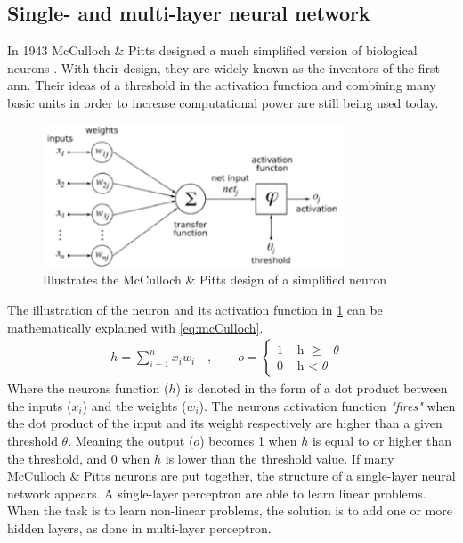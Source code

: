 \documentclass[USenglish]{ifimaster}  %
\begin{document}
\subsection{Single- and multi-layer neural network}
In 1943 McCulloch \& Pitts designed a much simplified version of biological neurons \cite{mcculloch_pitts}. With their design, they are widely known as the inventors of the first \ac{ann}. Their ideas of a threshold in the activation function and combining many basic units in order to increase computational power are still being used today.
\begin{figure}[H]
    \centering
    \includegraphics[width=0.8\textwidth]{bilder/mcculloch_and_pitts.png}
    \caption{Illustrates the McCulloch \& Pitts design of a simplified neuron \cite{website:mcCulloch_img}}
    \label{fig:mcculoch_and_pitts}
\end{figure}
The illustration of the neuron and its activation function in \cref{fig:mcculoch_and_pitts} can be mathematically explained with \cref{eq:mcCulloch}.
\begin{equation}\label{eq:mcCulloch}
\begin{aligned}
    {h = \sum_{i=1}^{n} x_i w_i \quad , \quad\quad o =
\begin{cases}
    1 & \text{ h $\geq$ $\theta$ }  \\
    0 & \text{ h < $\theta$ }
\end{cases}}
\end{aligned}
\end{equation}
Where the neurons function ($h$) is denoted in the form of a dot product between the inputs ($x_i$) and the weights ($w_i$). The neurons activation function \textit{"fires"} when the dot product of the input and its weight respectively are higher than a given threshold $\theta$. Meaning the output ($o$) becomes 1 when $h$ is equal to or higher than the threshold, and 0 when $h$ is lower than the threshold value.
\newline
\newline
If many McCulloch \& Pitts neurons are put together, the structure of a single-layer neural network appears. A single-layer perceptron are able to learn linear problems. When the task is to learn non-linear problems, the solution is to add one or more hidden layers, as done in multi-layer perceptron.   
\end{document}
